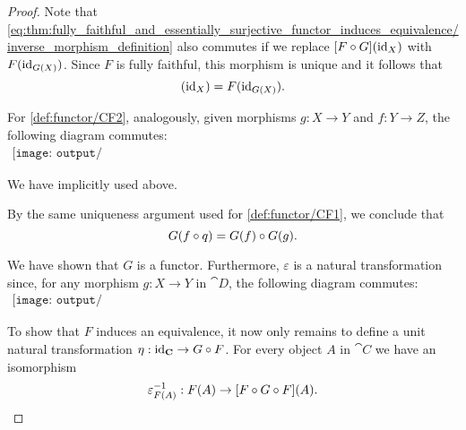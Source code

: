 \begin{proof}
  Note that \eqref{eq:thm:fully_faithful_and_essentially_surjective_functor_induces_equivalence/inverse_morphism_definition} also commutes if we replace \( [F \bincirc G](\id_X) \) with \( F(\operatorname{id}_{G(X)}) \). Since \( F \) is fully faithful, this morphism is unique and it follows that
  \begin{equation*}
    [F \bincirc G](\id_X) = F(\id_{G(X)}).
  \end{equation*}

  For \ref{def:functor/CF2}, analogously, given morphisms \( g: X \to Y \) and \( f: Y \to Z \), the following diagram commutes:
  \begin{equation}\label{eq:thm:fully_faithful_and_essentially_surjective_functor_induces_equivalence/composition}
    \begin{aligned}
      \texttt{[image: output/thm\_\_fully\_faithful\_and\_essentially\_surjective\_functor\_induces\_equivalence]}
    \end{aligned}
  \end{equation}

  We have implicitly used  above.

  By the same uniqueness argument used for \ref{def:functor/CF1}, we conclude that
  \begin{equation*}
    G(f \bincirc q) = G(f) \bincirc G(g).
  \end{equation*}

  We have shown that \( G \) is a functor. Furthermore, \( \varepsilon \) is a natural transformation since, for any morphism \( g: X \to Y \) in \( \cat{D} \), the following diagram commutes:
  \begin{equation}\label{eq:thm:fully_faithful_and_essentially_surjective_functor_induces_equivalence/varepsilon}
    \begin{aligned}
      \texttt{[image: output/thm\_\_fully\_faithful\_and\_essentially\_surjective\_functor\_induces\_equivalence]}
    \end{aligned}
  \end{equation}

  To show that \( F \) induces an equivalence, it now only remains to define a unit natural transformation \( \eta: \id_{\cat{C}} \to G \bincirc F \). For every object \( A \) in \( \cat{C} \) we have an isomorphism
  \begin{equation*}
    \varepsilon_{F(A)}^{-1}: F(A) \to [F \bincirc G \bincirc F](A).
  \end{equation*}


\end{proof}
